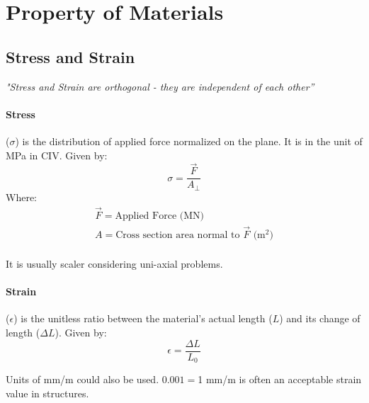 \section{Property of Materials}
\subsection{Stress and Strain}
\begin{center}
    \textit{"Stress and Strain are orthogonal - they are independent of each other''}
\end{center}
\begin{shaded}
\paragraph{Stress} ($\sigma$) is the distribution of applied force normalized on the plane. It is in the unit of MPa in CIV. Given by:
\begin{equation}\label{stress}
    \sigma = \frac{\Vec{F}}{A_\perp}
\end{equation}
Where:
    \begin{equation*}
    \begin{split}
    \Vec{F} = \text{Applied Force (MN)} \\
    A = \text{Cross section area normal to $\Vec{F}$ (m$^2$)} \\
    \end{split}
    \end{equation*}
\begin{note}
It is usually scaler considering uni-axial problems.
\end{note}
\end{shaded}
\begin{shaded}
    \paragraph{Strain} ($\epsilon$) is the unitless ratio between the material's actual length ($L$) and its change of length ($\Delta L$). Given by:
    \begin{equation}\label{strain}
        \epsilon = \frac{\Delta L}{L_0}
    \end{equation}
\begin{note}
Units of mm/m could also be used. $0.001=$1 mm/m is often an acceptable strain value in structures.
\end{note}
\end{shaded}

